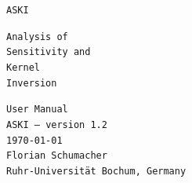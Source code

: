 \begin{titlepage}
\thispagestyle{empty}

  \begin{center}
    \tt \Huge ASKI
  \end{center}
  \vspace*{2cm}

  \begin{minipage}{0.5\textwidth}
    \begin{flushleft}
      \fontsize{20}{40} \selectfont
      {\tt {\Huge A}{\large nalysis of} \\ {\Huge S}{\large ensitivity and } \\ {\Huge\tt K}{\large ernel} \\ {\Huge\tt I}{\large nversion} }
    \end{flushleft}
  \end{minipage}
  \hfill
  \begin{minipage}{0.5\textwidth}
    \begin{flushright}
      {\fontsize{20}{40} \selectfont \tt {\Huge User Manual} \\  ASKI {\rm --} {\large version 1.2} \\ {\large \mydate \today} \\}
      {\tt {\large Florian Schumacher} \\ {\small Ruhr-Universit\"at Bochum, Germany} }
    \end{flushright}
  \end{minipage}

\vspace*{3cm}

\begin{center}
  \setlength{\fboxsep}{0pt}%
  \setlength{\fboxrule}{2pt}%
\end{center}

\end{titlepage}

